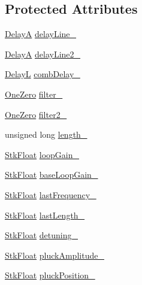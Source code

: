 \subsection*{Protected Attributes}
\begin{DoxyCompactItemize}
\item 
\hyperlink{class_nyq_1_1_delay_a}{DelayA} \hyperlink{class_nyq_1_1_pluck_two_af18f25d4c478f1f4cf180135e8e825f6}{delay\+Line\+\_\+}
\item 
\hyperlink{class_nyq_1_1_delay_a}{DelayA} \hyperlink{class_nyq_1_1_pluck_two_ab590b0ff27280ab7517adc2c8d01aef3}{delay\+Line2\+\_\+}
\item 
\hyperlink{class_nyq_1_1_delay_l}{DelayL} \hyperlink{class_nyq_1_1_pluck_two_a48b3e99163a90ddc8adc1295d84370be}{comb\+Delay\+\_\+}
\item 
\hyperlink{class_nyq_1_1_one_zero}{One\+Zero} \hyperlink{class_nyq_1_1_pluck_two_aa237c44f847e284e5e80708f35593a2e}{filter\+\_\+}
\item 
\hyperlink{class_nyq_1_1_one_zero}{One\+Zero} \hyperlink{class_nyq_1_1_pluck_two_ac8a331da8fed9fa5b543ec6e18047155}{filter2\+\_\+}
\item 
unsigned long \hyperlink{class_nyq_1_1_pluck_two_aa28cf40cc6d1d1115b059feb1faaef8c}{length\+\_\+}
\item 
\hyperlink{namespace_nyq_a044fa20a706520a617bbbf458a7db7e4}{Stk\+Float} \hyperlink{class_nyq_1_1_pluck_two_a6c65ee2ac1c22d908db2d3d3f760ab4d}{loop\+Gain\+\_\+}
\item 
\hyperlink{namespace_nyq_a044fa20a706520a617bbbf458a7db7e4}{Stk\+Float} \hyperlink{class_nyq_1_1_pluck_two_a5b656cecca113562f28a15947e38b042}{base\+Loop\+Gain\+\_\+}
\item 
\hyperlink{namespace_nyq_a044fa20a706520a617bbbf458a7db7e4}{Stk\+Float} \hyperlink{class_nyq_1_1_pluck_two_a7354fa7688bb8f06eb7539613d4dea9b}{last\+Frequency\+\_\+}
\item 
\hyperlink{namespace_nyq_a044fa20a706520a617bbbf458a7db7e4}{Stk\+Float} \hyperlink{class_nyq_1_1_pluck_two_a32f29e60b96fae38c03b354e693fa641}{last\+Length\+\_\+}
\item 
\hyperlink{namespace_nyq_a044fa20a706520a617bbbf458a7db7e4}{Stk\+Float} \hyperlink{class_nyq_1_1_pluck_two_a25902b042ba1c494ceb087ce67fdcd4d}{detuning\+\_\+}
\item 
\hyperlink{namespace_nyq_a044fa20a706520a617bbbf458a7db7e4}{Stk\+Float} \hyperlink{class_nyq_1_1_pluck_two_afd53362886352d4d2953b20f21f497c4}{pluck\+Amplitude\+\_\+}
\item 
\hyperlink{namespace_nyq_a044fa20a706520a617bbbf458a7db7e4}{Stk\+Float} \hyperlink{class_nyq_1_1_pluck_two_a7b248637bfee376fe654173e7dddcc30}{pluck\+Position\+\_\+}
\end{DoxyCompactItemize}
